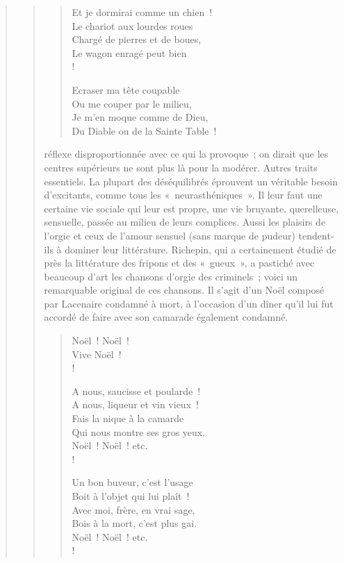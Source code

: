\documentclass[french,twoside]{book} %
\begin{document}
\begin{verse}
\begin{verse}
\begin{verse}
Et je dormirai comme un chien !\\
Le chariot aux lourdes roues\\
Chargé de pierres et de boues,\\
Le wagon enragé peut bien\\!

Ecraser ma tête coupable\\
Ou me couper par le milieu,\\
Je m’en moque comme de Dieu,\\
Du Diable ou de la Sainte Table !\\
\end{verse}

\noindent réflexe disproportionnée avec ce qui la provoque ; on dirait que les centres supérieurs ne sont plus là pour la modérer. Autres traits essentiels. La plupart des déséquilibrés éprouvent un véritable besoin d’excitants, comme tous les « neurasthéniques ». Il leur faut une certaine vie sociale qui leur est propre, une vie bruyante, querelleuse, sensuelle, passée au milieu de leurs complices. Aussi les plaisirs de l’orgie et ceux de l’amour sensuel (sans marque de pudeur) tendent-ils à dominer leur littérature. Richepin, qui a certainement étudié de près la littérature des fripons et des « gueux », a pastiché avec beaucoup d’art les chansons d’orgie des criminels ; voici un remarquable original de ces chansons. Il s’agit d’un Noël composé par Lacenaire condamné à mort, à l’occasion d’un dîner qu’il lui fut accordé de faire avec son camarade également condamné. \par


\begin{verse}
Noël ! Noël !\\
Vive Noël !\\!

A nous, saucisse et poularde !\\
A nous, liqueur et vin vieux !\\
Fais la nique à la camarde\\
Qui nous montre ses gros yeux.\\
Noël ! Noël ! etc.\\!

Un bon buveur, c’est l’usage\\
Boit à l’objet qui lui plaît !\\
Avec moi, frère, en vrai sage,\\
Bois à la mort, c’est plus gai.\\
Noël ! Noël ! etc.\\!


\end{verse}
\end{verse}
\end{verse}
\end{document}

